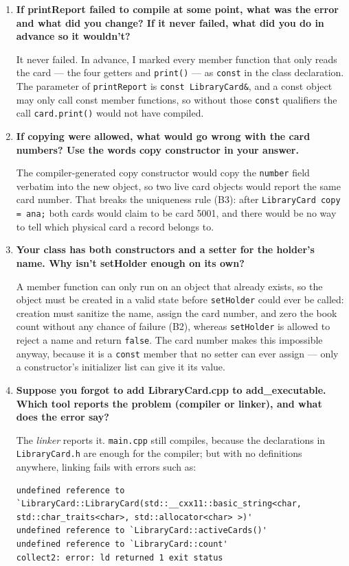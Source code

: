 \documentclass[11pt]{article}
\begin{document}
\begin{enumerate}[leftmargin=2em, itemsep=1em]
\item \textbf{If printReport failed to compile at some point, what was the error
and what did you change? If it never failed, what did you do in advance so it
wouldn't?}

It never failed. In advance, I marked every member function that only reads the
card --- the four getters and \texttt{print()} --- as \texttt{const} in the
class declaration. The parameter of \texttt{printReport} is
\texttt{const LibraryCard\&}, and a const object may only call const member
functions, so without those \texttt{const} qualifiers the call
\texttt{card.print()} would not have compiled.

\item \textbf{If copying were allowed, what would go wrong with the card numbers?
Use the words copy constructor in your answer.}

The compiler-generated copy constructor would copy the \texttt{number} field
verbatim into the new object, so two live card objects would report the same
card number. That breaks the uniqueness rule (B3): after
\texttt{LibraryCard copy = ana;} both cards would claim to be card 5001, and
there would be no way to tell which physical card a record belongs to.

\item \textbf{Your class has both constructors and a setter for the holder's name.
Why isn't setHolder enough on its own?}

A member function can only run on an object that already exists, so the object
must be created in a valid state before \texttt{setHolder} could ever be called:
creation must sanitize the name, assign the card number, and zero the book
count without any chance of failure (B2), whereas \texttt{setHolder} is allowed
to reject a name and return \texttt{false}. The card number makes this
impossible anyway, because it is a \texttt{const} member that no setter can
ever assign --- only a constructor's initializer list can give it its value.

\item \textbf{Suppose you forgot to add LibraryCard.cpp to add\_executable. Which
tool reports the problem (compiler or linker), and what does the error say?}

The \emph{linker} reports it. \texttt{main.cpp} still compiles, because the
declarations in \texttt{LibraryCard.h} are enough for the compiler; but with no
definitions anywhere, linking fails with errors such as:
\begin{verbatim}
undefined reference to `LibraryCard::LibraryCard(std::__cxx11::basic_string<char, std::char_traits<char>, std::allocator<char> >)'
undefined reference to `LibraryCard::activeCards()'
undefined reference to `LibraryCard::count'
collect2: error: ld returned 1 exit status
\end{verbatim}

\end{enumerate}
\end{document}
